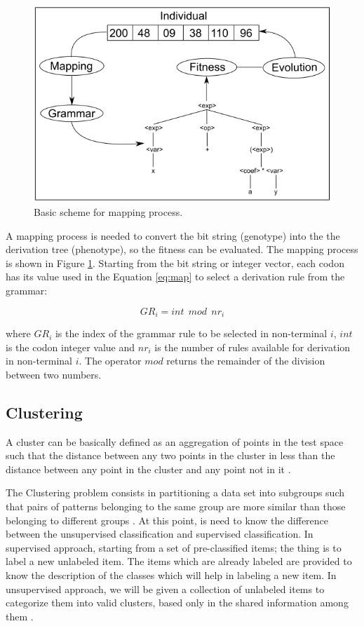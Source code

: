 \documentclass[journal]{IEEEtran}
\begin{document}
\begin{figure}[!htb]
	\centering
	\includegraphics[scale=.4]{figures/ge_algo.png}
	\caption{Basic scheme for mapping process. \cite{cerri2013grammatical}}
	\label{fig:ge_algo}
\end{figure}

A mapping process is needed to convert the bit string (genotype) into the the derivation tree (phenotype), so the fitness can be evaluated. The mapping process is shown in Figure \ref{fig:ge_algo}. Starting from the bit string or integer vector, each codon has its value used in the Equation \ref{eq:map} to select a derivation rule from the grammar:

\begin{equation}\label{eq:map}
GR_i = int~~mod~~nr_i
\end{equation}

where $GR_i$ is the index of the grammar rule to be selected in non-terminal $i$, $int$ is the codon integer value and $nr_i$ is the number of rules available for derivation in non-terminal $i$. The operator $mod$ returns the remainder of the division between two numbers.

\subsection{Clustering}

A cluster can be basically defined as an aggregation of points in the test space such that the distance between any two points in the cluster in less than the distance between any point in the cluster and any point not in it \cite{jain1988algorithms}.

The Clustering problem consists in partitioning a data set into subgroups such that pairs of patterns belonging to the same group are more similar than those belonging to different groups \cite{boric2007genetic}. At this point, is need to know the difference between the unsupervised classification and supervised classification. In supervised approach, starting from a set of pre-classified items; the thing is to label a new unlabeled item. The items which are already labeled are provided to know the description of the classes which will help in labeling a new item. In unsupervised approach, we will be given a collection of unlabeled items to categorize them into valid clusters, based only in the shared information among them \cite{ahalya2015data}.
\end{document}
